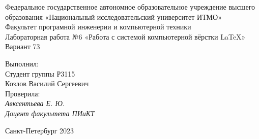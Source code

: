 \begin{center}
\Large
   Федеральное государственное автономное образовательное учреждение высшего образования «Национальный исследовательский университет ИТМО»\\

    \vspace{65mm}
Факультет програмной инженерии и компьютерной техники\\
Лабораторная работа №6
«Работа с системой
компьютерной вёрстки \LaTeX»\\
Вариант 73\\
\end{center}

\vspace{65mm}
\begin{flushright}
\Large
Выполнил:\\
Студент группы Р3115\\
Козлов Василий Сергеевич\\
\vspace{15mm}
Проверила:\\
\textit{Авксентьева Е. Ю.}\\
\textit{Доцент факультета ПИиКТ}\\
\end{flushright}
\vspace{20mm}
\begin{center}
\Large
    Санкт-Петербург  2023
\end{center}

\normalsize
